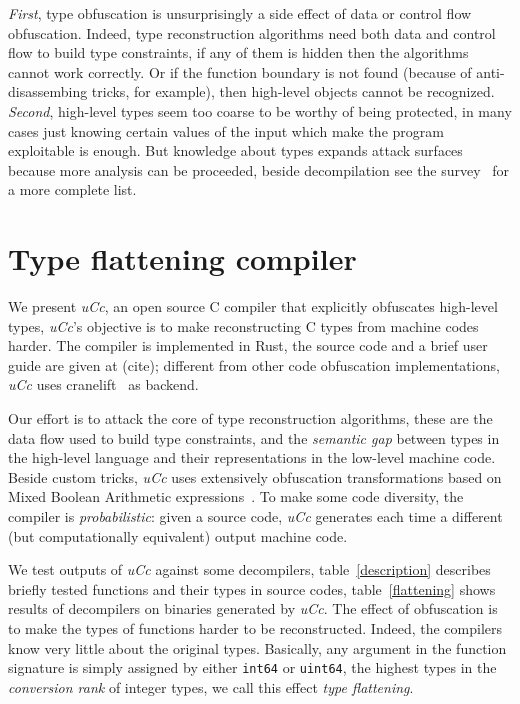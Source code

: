 \documentclass[a4paper]{llncs}
\begin{document}
\emph{First}, type obfuscation is unsurprisingly a side effect of data or control flow obfuscation.
Indeed, type reconstruction algorithms need both data and control flow to build type constraints,
if any of them is hidden
then the algorithms cannot work correctly. Or if the function boundary is not found
(because of anti-disassembing tricks, for example), then high-level objects cannot be recognized.
\emph{Second}, high-level types seem too coarse to be worthy
of being protected, in many cases just knowing certain values of the input which make the program
exploitable is enough. But knowledge about types expands attack surfaces because more analysis
can be proceeded, beside decompilation see the survey~\cite{caballero_type_2016} for a
more complete list.


\section{Type flattening compiler}
We present \emph{uCc}, an open source C compiler that explicitly obfuscates high-level types, \emph{uCc}'s
objective is to make reconstructing C types from machine codes harder.
The compiler is implemented in Rust, the source code and a brief user guide are given at (cite); different
from other code obfuscation implementations, \emph{uCc} uses cranelift~\cite{noauthor_cranelift_nodate}
as backend.

Our effort is to attack the core of type reconstruction algorithms,
these are the data flow used to build type constraints, and the \emph{semantic gap} between types in the high-level language and their
representations in the low-level machine code.
Beside custom tricks, \emph{uCc} uses extensively
obfuscation transformations based on Mixed Boolean Arithmetic expressions~\cite{eyrolles_obfuscation_2017,zhou_information_2007}.
To make some code diversity, the compiler is \emph{probabilistic}: given a source
code, \emph{uCc} generates each time a different (but computationally equivalent) output machine code.

We test outputs of \emph{uCc} against some decompilers, table~\ref{description} describes briefly
tested functions and their types in source codes, table~\ref{flattening} shows results of
decompilers on binaries generated by \emph{uCc}. The effect of obfuscation is to make the types
of functions harder to be reconstructed. Indeed, the compilers know very little about the original
types. Basically, any argument in the function signature is simply assigned by either \texttt{int64}
or \texttt{uint64}, the highest types in the \emph{conversion rank} of integer types, we call this
effect \emph{type flattening}.
\end{document}

